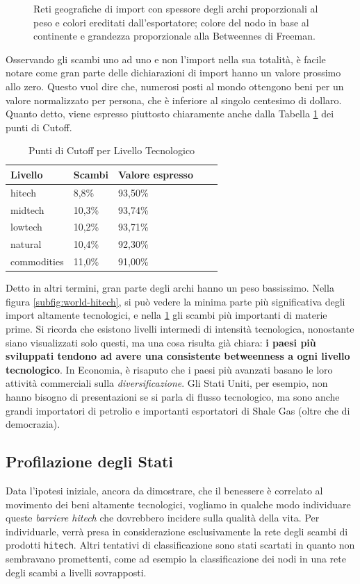 \documentclass[]{article}
\begin{document}
\begin{multicols}{2}
\begin{figure}[]
\begin{subfigure}[b]{1\textwidth}
			\label{subfig:world-comm}
		\end{subfigure}
		\caption{Reti geografiche di import con spessore degli archi proporzionali al peso e colori ereditati dall'esportatore; colore del nodo in base al continente e grandezza proporzionale alla Betweennes di Freeman.}
		\label{fig:world}
	\end{figure}
	Osservando gli scambi uno ad uno e non l'import nella sua totalità, è facile notare come gran parte delle dichiarazioni di import hanno un valore prossimo allo zero. Questo vuol dire che, numerosi posti al mondo ottengono beni per un valore normalizzato per persona, che è inferiore al singolo centesimo di dollaro. Quanto detto, viene espresso piuttosto chiaramente anche dalla Tabella \ref{tab:cutoff} dei punti di Cutoff.
	\begin{table}[H]
		\centering
		\caption{Punti di Cutoff per Livello Tecnologico}
		\label{tab:cutoff}
		\begin{tabular}{@{}lllll@{}}
			\toprule
			Livello & Scambi & Valore espresso \\ \midrule
			hitech & 8,8\% & 93,50\% \\
			midtech & 10,3\% & 93,74\% \\
			lowtech & 10,2\% & 93,71\% \\
			natural & 10,4\% & 92,30\% \\
			commodities & 11,0\% & 91,00\% \\ \bottomrule
			\hline 
		\end{tabular}
	\end{table}
	Detto in altri termini, gran parte degli archi hanno un peso bassissimo. Nella figura \ref{subfig:world-hitech}, si può vedere la minima parte più significativa degli import altamente tecnologici, e nella \ref{subfig:world-comm} gli scambi più importanti di materie prime. Si ricorda che esistono livelli intermedi di intensità tecnologica, nonostante siano visualizzati solo questi, ma una cosa risulta già chiara: \textbf{i paesi più sviluppati tendono ad avere una consistente betweenness a ogni livello tecnologico}. In Economia, è risaputo che i paesi più avanzati basano le loro attività commerciali sulla \textit{diversificazione}. Gli Stati Uniti, per esempio, non hanno bisogno di presentazioni se si parla di flusso tecnologico, ma sono anche grandi importatori di petrolio e importanti esportatori di Shale Gas (oltre che di democrazia).

	\subsection{Profilazione degli Stati}
	Data l'ipotesi iniziale, ancora da dimostrare, che il benessere è correlato al movimento dei beni altamente tecnologici, vogliamo in qualche modo individuare queste \textit{barriere hitech} che dovrebbero incidere sulla qualità della vita. Per individuarle, verrà presa in considerazione esclusivamente la rete degli scambi di prodotti \texttt{hitech}. Altri tentativi di classificazione sono stati scartati in quanto non sembravano promettenti, come ad esempio la classificazione dei nodi in una rete degli scambi a livelli sovrapposti.
	

\end{multicols}
\end{document}
